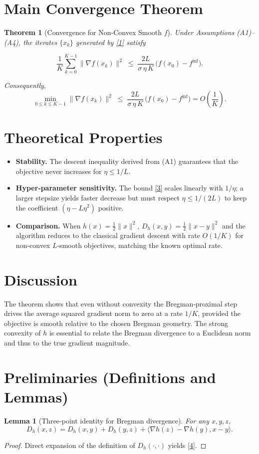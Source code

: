 \documentclass{article}
\newtheorem{theorem}{Theorem}
\newtheorem{lemma}{Lemma}
\newcommand{\D}[2]{D_{h}(#1,#2)}
\newcommand{\grad}{\nabla}
\newcommand{\inner}[2]{\langle #1,#2\rangle}
\newcommand{\norm}[1]{\|#1\|}
\begin{document}
\section*{Main Convergence Theorem}
\begin{theorem}[Convergence for Non‑Convex Smooth $f$]\label{thm:main}
Under Assumptions (A1)–(A4), the iterates $\{x_k\}$ generated by \eqref{1} satisfy  

\[
\frac{1}{K}\sum_{k=0}^{K-1}\norm{\grad f(x_k)}^{2}
\;\le\;
\frac{2L}{\sigma\,\eta\,K}\,\bigl(f(x_{0})-f^{\inf}\bigr).
\tag{3}
\]

Consequently,
\[
\min_{0\le k\le K-1}\norm{\grad f(x_k)}^{2}
\;\le\;
\frac{2L}{\sigma\,\eta\,K}\,\bigl(f(x_{0})-f^{\inf}\bigr)
=O\!\left(\frac{1}{K}\right).
\]
\end{theorem}

\section*{Theoretical Properties}
\begin{itemize}
\item \textbf{Stability.} The descent inequality derived from (A1) guarantees that the objective never increases for $\eta\le1/L$.
\item \textbf{Hyper‑parameter sensitivity.} The bound \eqref{3} scales linearly with $1/\eta$; a larger stepsize yields faster decrease but must respect $\eta\le1/(2L)$ to keep the coefficient $(\eta-L\eta^{2})$ positive.
\item \textbf{Comparison.} When $h(x)=\frac12\norm{x}^{2}$, $\D{x}{y}=\frac12\norm{x-y}^{2}$ and the algorithm reduces to the classical gradient descent with rate $O(1/K)$ for non‑convex $L$‑smooth objectives, matching the known optimal rate.
\end{itemize}

\section*{Discussion}
The theorem shows that even without convexity the Bregman‑proximal step drives the average squared gradient norm to zero at a rate $1/K$, provided the objective is smooth relative to the chosen Bregman geometry. The strong convexity of $h$ is essential to relate the Bregman divergence to a Euclidean norm and thus to the true gradient magnitude.

\newpage
\section*{Preliminaries (Definitions and Lemmas)}
\begin{lemma}[Three‑point identity for Bregman divergence]\label{lem:three}
For any $x,y,z$,
\[
\D{x}{z}= \D{x}{y}+ \D{y}{z}+ \inner{\grad h(z)-\grad h(y)}{x-y}.
\tag{4}
\]
\end{lemma}
\begin{proof}
Direct expansion of the definition of $\D{\cdot}{\cdot}$ yields \eqref{4}. \qedhere
\end{proof}
\end{document}
